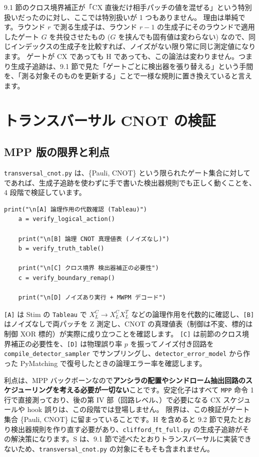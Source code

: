 9.1 節のクロス境界補正が「CX 直後だけ相手パッチの値を混ぜる」という特別扱いだったのに対し、ここでは特別扱いが 1 つもありません。
理由は単純です。ラウンド $r$ で測る生成子は、ラウンド $r-1$ の生成子にそのラウンドで適用したゲート $G$ を共役させたもの ($G$ を挟んでも固有値は変わらない) なので、同じインデックスの生成子を比較すれば、ノイズがない限り常に同じ測定値になります。
ゲートが CX であっても H であっても、この論法は変わりません。つまり生成子追跡は、9.1 節で見た「ゲートごとに検出器を張り替える」という手間を、「測る対象そのものを更新する」ことで一様な規則に置き換えていると言えます。

\section{トランスバーサル CNOT の検証}\label{sec:tcnot_verify}

\subsection{MPP 版の限界と利点}\label{subsec:limits}

\texttt{transversal\_cnot.py} は、\{Pauli, CNOT\} という限られたゲート集合に対してであれば、生成子追跡を使わずに手で書いた検出器規則でも正しく動くことを、4 段階で検証しています。

\begin{lstlisting}[caption={4 段階の検証（src/stages/01\_mpp/src/ftqc/transversal\_cnot.py の main）}]
    print("\n[A] 論理作用の代数確認 (Tableau)")
    a = verify_logical_action()

    print("\n[B] 論理 CNOT 真理値表 (ノイズなし)")
    b = verify_truth_table()

    print("\n[C] クロス境界 検出器補正の必要性")
    c = verify_boundary_remap()

    print("\n[D] ノイズあり実行 + MWPM デコード")
\end{lstlisting}

\texttt{[A]} は Stim の \texttt{Tableau} で $X_L^C \to X_L^C X_L^T$ などの論理作用を代数的に確認し、\texttt{[B]} はノイズなしで両パッチを Z 測定し、CNOT の真理値表（制御は不変、標的は制御 XOR 標的）が実際に成り立つことを確認します。
\texttt{[C]} は前節のクロス境界補正の必要性を、\texttt{[D]} は物理誤り率 $p$ を振ってノイズ付き回路を \texttt{compile\_detector\_sampler} でサンプリングし、\texttt{detector\_error\_model} から作った PyMatching で復号したときの論理エラー率を確認します。

利点は、MPP バックボーンなので\textbf{アンシラの配置やシンドローム抽出回路のスケジューリングを考える必要が一切ない}ことです。安定化子はすべて \texttt{MPP} 命令 1 行で直接測っており、後の第 IV 部（回路レベル、）で必要になる CX スケジュールや hook 誤りは、この段階では登場しません。
限界は、この検証がゲート集合 \{Pauli, CNOT\} に留まっていることです。H を含めると 9.2 節で見たとおり検出器規則を作り直す必要があり、\texttt{clifford\_ft\_full.py} の生成子追跡がその解決策になります。S は、9.1 節で述べたとおりトランスバーサルに実装できないため、\texttt{transversal\_cnot.py} の対象にそもそも含まれません。

